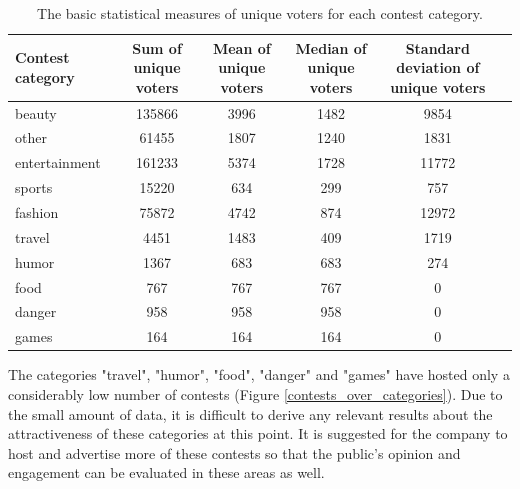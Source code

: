     \begin{table}[]
        \centering
        \begin{adjustbox}{width=1\textwidth}
            \begin{tabular}{l|c|c|c|c|c}
                \textbf{Contest category} & \textbf{Sum of unique voters} & \textbf{Mean of unique voters} & \textbf{Median of unique voters} & \textbf{Standard deviation of unique voters} \\
                \hline
                beauty & 135866 & 3996 & 1482 & 9854 \\
                other & 61455 & 1807 & 1240 & 1831 \\
                entertainment & 161233 & 5374 & 1728 & 11772 \\
                sports & 15220 & 634 & 299 & 757 \\
                fashion & 75872 & 4742 & 874 & 12972 \\
                travel & 4451 & 1483 & 409 & 1719 \\
                humor & 1367 & 683 & 683 & 274 \\
                food & 767 & 767 & 767 & 0 \\
                danger & 958 & 958 & 958 & 0 \\
                games & 164 & 164 & 164 & 0
            \end{tabular}
        \end{adjustbox}
        \caption{The basic statistical measures of unique voters for each contest category.}
        \label{user_engagement_over_categories}
    \end{table}
    
    The categories "travel", "humor", "food", "danger" and "games" have hosted only a considerably low number of contests (Figure \ref{contests_over_categories}). Due to the small amount of data, it is difficult to derive any relevant results about the attractiveness of these categories at this point. It is suggested for the company to host and advertise more of these contests so that the public's opinion and engagement can be evaluated in these areas as well.


